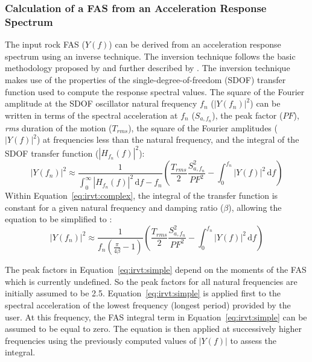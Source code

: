 \documentclass[12pt,oneside]{book}
\newcommand{\ud}{\,\mathrm{d}}
\begin{document}

\subsubsection{Calculation of a FAS from an Acceleration Response
    Spectrum}\label{ch:sra:methods:rvt:inversion}

The input rock FAS ($Y(f)$) can be derived from an acceleration response spectrum using an inverse
technique.  The inversion technique follows the basic methodology proposed by \citet{gasparini:76} and further
described by \citet{rathje:05}.  The inversion technique makes use of the properties of the
single-degree-of-freedom (SDOF) transfer function used to compute the response spectral values.
The square of the Fourier amplitude at the SDOF oscillator natural frequency
$f_n$ ($|Y(f_n)|^2$) can be written in terms of the spectral acceleration at $f_n$ ($S_{a,f_n}$),
the peak factor ($PF$), \emph{rms} duration of the motion ($T_{rms}$), the square of the Fourier
amplitudes ($|Y(f)|^2$) at frequencies less than the natural frequency, and the integral of the SDOF
transfer function ($|H_{f_n}(f)|^2$):
\begin{equation}
    |Y(f_n)|^2 \approx  \frac{1}{\int_{0}^{\infty} |H_{f_n}(f)|^2 \ud f - f_n} \left(
        \frac{T_{rms}}{2}\frac{S_{a,f_n}^2}{PF^2} - \int_{0}^{f_n} |Y(f)|^2 \ud f
    \right)
    \label{eq:irvt:complex}
\end{equation}
Within Equation~\ref{eq:irvt:complex}, the integral of the transfer function is constant for a given
natural frequency and damping ratio ($\beta$), allowing the equation to be simplified to \citep{gasparini:76}:
\begin{equation}
    |Y(f_n)|^2 \approx  \frac{1}{f_n \left( \frac{\pi}{4\beta} - 1 \right)} \left(
        \frac{T_{rms}}{2}\frac{S_{a,f_n}^2}{PF^2} - \int_{0}^{f_n} |Y(f)|^2 \ud f
    \right)
    \label{eq:irvt:simple}
\end{equation}

The peak factors in Equation~\ref{eq:irvt:simple} depend on the moments of the FAS which is
currently undefined.  So the peak factors for all natural frequencies are initially assumed to be 2.5.
Equation~\ref{eq:irvt:simple} is applied first to the spectral acceleration of the lowest frequency
(longest period) provided by the user. At this frequency, the FAS integral term in Equation~\ref{eq:irvt:simple}
can be assumed to be equal to zero.  The equation is then applied at successively higher frequencies
using the previously computed values of $|Y(f)|$ to assess the integral.
\end{document}
